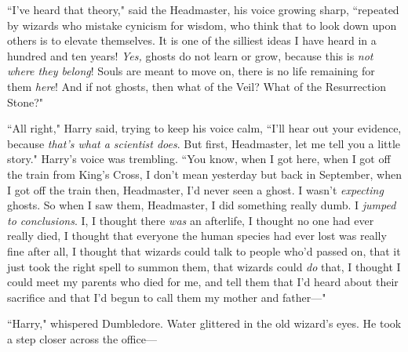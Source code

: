 ``I've heard that theory," said the Headmaster, his voice growing sharp, ``repeated by wizards who mistake cynicism for wisdom, who think that to look down upon others is to elevate themselves. It is one of the silliest ideas I have heard in a hundred and ten years! \emph{Yes,} ghosts do not learn or grow, because this is \emph{not where they belong}! Souls are meant to move on, there is no life remaining for them \emph{here}! And if not ghosts, then what of the Veil? What of the Resurrection Stone?"

``All right," Harry said, trying to keep his voice calm, ``I'll hear out your evidence, because \emph{that's what a scientist does}. But first, Headmaster, let me tell you a little story." Harry's voice was trembling. ``You know, when I got here, when I got off the train from King's Cross, I don't mean yesterday but back in September, when I got off the train then, Headmaster, I'd never seen a ghost. I wasn't \emph{expecting} ghosts. So when I saw them, Headmaster, I did something really dumb. I \emph{jumped to conclusions}. I, I thought there \emph{was} an afterlife, I thought no one had ever really died, I thought that everyone the human species had ever lost was really fine after all, I thought that wizards could talk to people who'd passed on, that it just took the right spell to summon them, that wizards could \emph{do} that, I thought I could meet my parents who died for me, and tell them that I'd heard about their sacrifice and that I'd begun to call them my mother and father—"

``Harry," whispered Dumbledore. Water glittered in the old wizard's eyes. He took a step closer across the office—

